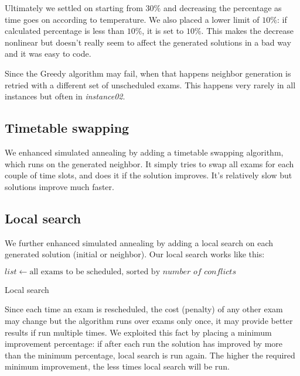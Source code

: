 \documentclass[11pt, a4paper, leqno]{article}
\begin{document}
	Ultimately we settled on starting from $30\%$ and decreasing the percentage as time goes on according to temperature. We also placed a lower limit of $10\%$: if calculated percentage is less than $10\%$, it is set to $10\%$. This makes the decrease nonlinear but doesn't really seem to affect the generated solutions in a bad way and it was easy to code.
	
	Since the Greedy algorithm may fail, when that happens neighbor generation is retried with a different set of unscheduled exams. This happens very rarely in all instances but often in \textit{instance02}.
	
	\subsection{Timetable swapping}
	
	We enhanced simulated annealing by adding a timetable swapping algorithm, which runs on the generated neighbor. It simply tries to swap all exams for each couple of time slots, and does it if the solution improves. It's relatively slow but solutions improve much faster.
	
	\subsection{Local search}
	\label{local}
	
	We further enhanced simulated annealing by adding a local search on each generated solution (initial or neighbor). Our local search works like this:
	
	\begin{algorithm}[H]
		$list \gets \text{all exams to be scheduled, sorted by }\textit{number of conflicts}$\;
		\caption{Local search}
	\end{algorithm}
	
	Since each time an exam is rescheduled, the cost (penalty) of any other exam may change but the algorithm runs over exams only once, it may provide better results if run multiple times. We exploited this fact by placing a minimum improvement percentage: if after each run the solution has improved by more than the minimum percentage, local search is run again. The higher the required minimum improvement, the less times local search will be run.
	
\end{document}
